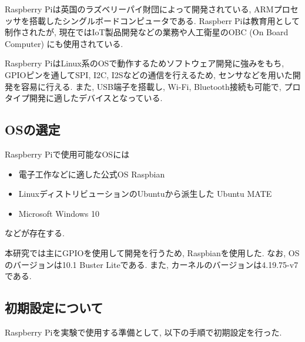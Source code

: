 Raspberry Piは英国のラズベリーパイ財団によって開発されている, ARMプロセッサを搭載したシングルボードコンピュータである. Raspberr
Piは教育用として制作されたが, 現在ではIoT製品開発などの業務や人工衛星のOBC (On Board Computer) にも使用されている. 

Raspberry PiはLinux系のOSで動作するためソフトウェア開発に強みをもち, GPIOピンを通してSPI, I2C, I2Sなどの通信を行えるため, センサなどを用いた開発を容易に行える. また, USB端子を搭載し, Wi-Fi, Bluetooth接続も可能で, プロタイプ開発に適したデバイスとなっている. 

\subsection{OSの選定}\label{choose-os}

Raspberry Piで使用可能なOSには

\begin{itemize}
\tightlist
\item
  電子工作などに適した公式OS Raspbian
\item
  LinuxディストリビューションのUbuntuから派生した Ubuntu MATE
\item
  Microsoft Windows 10
\end{itemize}

などが存在する. 

本研究では主にGPIOを使用して開発を行うため, Raspbianを使用した. なお, OSのバージョンは10.1
Buster Liteである. また, カーネルのバージョンは4.19.75-v7である. 

\subsection{初期設定について}\label{about-setup}

Raspberry Piを実験で使用する準備として, 以下の手順で初期設定を行った. 

